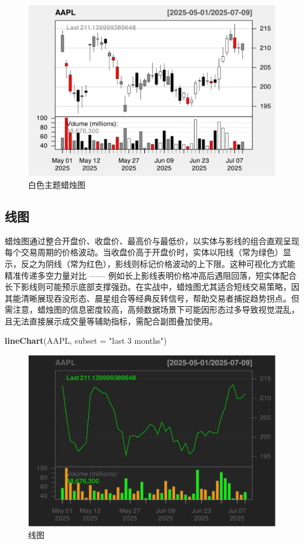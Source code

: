 \documentclass[]{ctexbook}
\newenvironment{Shaded}{\begin{snugshade}}{\end{snugshade}}
\newcommand{\AttributeTok}[1]{\textcolor[rgb]{0.13,0.29,0.53}{#1}}
\newcommand{\FunctionTok}[1]{\textcolor[rgb]{0.13,0.29,0.53}{\textbf{#1}}}
\newcommand{\NormalTok}[1]{#1}
\newcommand{\StringTok}[1]{\textcolor[rgb]{0.31,0.60,0.02}{#1}}
\begin{document}
\begin{figure}
\includegraphics[width=0.9\linewidth]{quantmod_files/figure-latex/cadleWhite-1} \caption{白色主题蜡烛图}\label{fig:cadleWhite}
\end{figure}

\subsection{线图}\label{ux7ebfux56fe}

蜡烛图通过整合开盘价、收盘价、最高价与最低价，以实体与影线的组合直观呈现每个交易周期的价格波动。当收盘价高于开盘价时，实体以阳线（常为绿色）显示，反之为阴线（常为红色），影线则标记价格波动的上下限。这种可视化方式能精准传递多空力量对比 ------ 例如长上影线表明价格冲高后遇阻回落，短实体配合长下影线则可能预示底部支撑强劲。在实战中，蜡烛图尤其适合短线交易策略，因其能清晰展现吞没形态、晨星组合等经典反转信号，帮助交易者捕捉趋势拐点。但需注意，蜡烛图的信息密度较高，高频数据场景下可能因形态过多导致视觉混乱，且无法直接展示成交量等辅助指标，需配合副图叠加使用。

\begin{Shaded}
\begin{Highlighting}[]
\FunctionTok{lineChart}\NormalTok{(AAPL, }\AttributeTok{subset =} \StringTok{"last 3 months"}\NormalTok{)}
\end{Highlighting}
\end{Shaded}

\begin{figure}
\includegraphics[width=0.9\linewidth]{quantmod_files/figure-latex/line-1} \caption{线图}\label{fig:line}
\end{figure}
\end{document}
